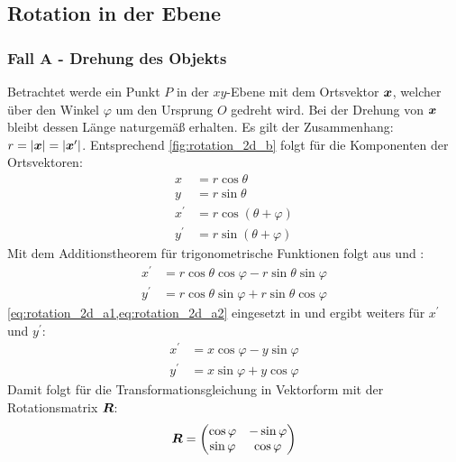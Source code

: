 \subsection{Rotation in der Ebene}
\label{subsec:rotation_2d}
\subsubsection{Fall A - Drehung des Objekts}
Betrachtet werde ein Punkt $P$ in der $xy$-Ebene mit dem Ortsvektor $\boldsymbol{x}$, welcher über den Winkel $\varphi$ um den Ursprung $O$ gedreht wird. Bei der Drehung von $\boldsymbol{x}$  bleibt dessen Länge naturgemäß erhalten. Es gilt der Zusammenhang: $r = |\boldsymbol{x}| = |\boldsymbol{x}^\prime|$. Entsprechend \cref{fig:rotation_2d_b} folgt für die Komponenten der Ortsvektoren:
\begin{align}
    x &= r\cos{\theta}\label{eq:rotation_2d_a1}\\
    y &= r\sin{\theta}\label{eq:rotation_2d_a2}\\
    x^\prime & = r\cos{(\theta+\varphi)}\label{eq:rotation_2d_a3}\\
    y^\prime & = r\sin{(\theta+\varphi)}\label{eq:rotation_2d_a4}
\end{align}
Mit dem Additionstheorem für trigonometrische Funktionen folgt aus  und :
\begin{align}
    x^\prime & = r\cos{\theta}\cos{\varphi}-r\sin{\theta}\sin{\varphi}\label{eq:rotation_2d_a5}\\
    y^\prime & = r\cos{\theta}\sin{\varphi}+r\sin{\theta}\cos{\varphi}\label{eq:rotation_2d_a6}
\end{align}
\cref{eq:rotation_2d_a1,eq:rotation_2d_a2} eingesetzt in  und  ergibt weiters für $x^\prime$ und $y^\prime$:
\begin{align}
    x^\prime & = x\cos{\varphi}-y\sin{\varphi}\label{eq:rotation_2d_a7}\\
    y^\prime & = x\sin{\varphi}+y\cos{\varphi}\label{eq:rotation_2d_a8}
\end{align}
Damit folgt für die Transformationsgleichung in Vektorform mit der Rotationsmatrix $\boldsymbol{R}$:
\begin{gather}
    \boldsymbol{R}
    =
    \begin{pmatrix}
        \cos{\varphi} & -\sin{\varphi} \\
        \sin{\varphi} & \cos{\varphi} 
    \end{pmatrix}
    \label{eq:rotation_2d_a9}
\end{gather}

